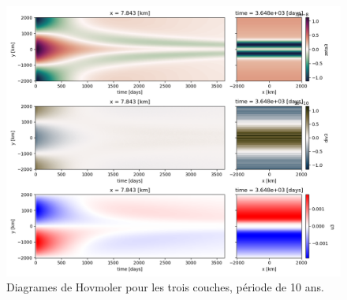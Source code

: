 \documentclass{article}
\numberwithin{equation}{section}
\begin{document}
\begin{figure}[htbp]
\centering
\includegraphics[width=.9\linewidth]{figures/tests/test3_2023-03-31.png}
\caption{\label{fig:orgada75b3}Diagrames de Hovmoler pour les trois couches, période de 10 ans.}
\end{figure}
\end{document}

